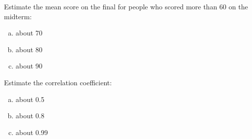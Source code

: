 \documentclass[letterpaper]{exam}
\begin{document}
  \begin{questions}
    






    \question[3] Estimate the mean score on the final for people who scored more than
      60 on the midterm:
      \label{q:exams.first}

      \begin{enumerate}[(a)]
        \item about 70
        \item about 80
        \item about 90
      \end{enumerate}

    \question[3] Estimate the correlation coefficient:
      \begin{enumerate}[(a)]
        \item about 0.5
        \item about 0.8
        \item about 0.99
      \end{enumerate}

    \question
      \label{q:exams.last}
      \begin{parts}
        

\end{parts}
\end{questions}
\end{document}
